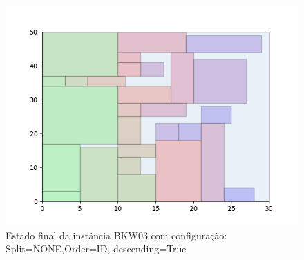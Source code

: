 \begin{figure}[H]
    \centering
    \caption[]{Estado final da instância BKW03 com configuração: Split=NONE,Order=ID, descending=True}
    \label{fig:bkw03-none-id-true}
    \includegraphics[scale=0.5]{output/figures/bkw/bkw03/none/id/true/00}
\end{figure}